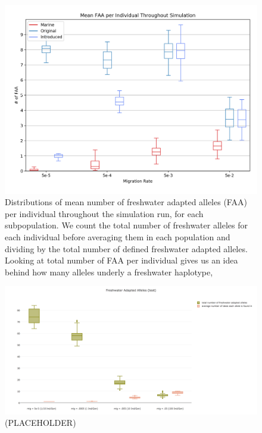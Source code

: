\documentclass{article}
\begin{document}
\begin{figure}
	\begin{center}
  		\includegraphics[width=\linewidth]{matplotlibPlots/MFAI.png}
  		\caption{Distributions of mean number of freshwater adapted alleles (FAA) per individual throughout the simulation run, for each subpopulation.
		We count the total number of freshwater alleles for each individual before averaging them in each population and dividing by the total number of defined
		freshwater adapted alleles.
		Looking at total number of FAA per individual gives us an idea behind how many alleles underly a freshwater haplotype, 
		}
  		\label{fig:MNFAI}
	\end{center}
\end{figure}

\begin{figure}
	\begin{center}
  		\includegraphics[width=\linewidth]{plotlyPlots/NumFAA.png}
  		\caption{(PLACEHOLDER)}
		\label{fig:NumFAA}
	\end{center}
\end{figure}
\end{document}
